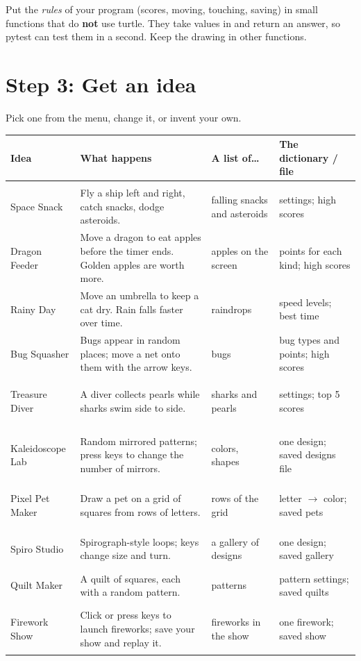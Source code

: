 \documentclass[level=2]{kidscode}
\begin{document}
\begin{tip}
Put the \emph{rules} of your program (scores, moving, touching, saving) in small functions that do
\textbf{not} use turtle. They take values in and return an answer, so pytest can test them in a second.
Keep the drawing in other functions.
\end{tip}

\section{Step 3: Get an idea}
Pick one from the menu, change it, or invent your own.

{\small
\renewcommand{\arraystretch}{1.3}
\begin{longtable}{@{}>{\bfseries\raggedright\arraybackslash}p{2.8cm}>{\raggedright\arraybackslash}p{4.4cm}>{\raggedright\arraybackslash}p{3.6cm}>{\raggedright\arraybackslash}p{3.6cm}@{}}
\toprule
Idea & What happens & A list of\ldots & The dictionary / file \\ \midrule\endhead
\multicolumn{4}{@{}l}{\textbf{Arcade games}} \\ \midrule
Space Snack & Fly a ship left and right, catch snacks, dodge asteroids. & falling snacks and asteroids & settings; high scores \\
Dragon Feeder & Move a dragon to eat apples before the timer ends. Golden apples are worth more. & apples on the screen & points for each kind; high scores \\
Rainy Day & Move an umbrella to keep a cat dry. Rain falls faster over time. & raindrops & speed levels; best time \\
Bug Squasher & Bugs appear in random places; move a net onto them with the arrow keys. & bugs & bug types and points; high scores \\
Treasure Diver & A diver collects pearls while sharks swim side to side. & sharks and pearls & settings; top 5 scores \\ \midrule
\multicolumn{4}{@{}l}{\textbf{Art studios}} \\ \midrule
Kaleidoscope Lab & Random mirrored patterns; press keys to change the number of mirrors. & colors, shapes & one design; saved designs file \\
Pixel Pet Maker & Draw a pet on a grid of squares from rows of letters. & rows of the grid & letter $\to$ color; saved pets \\
Spiro Studio & Spirograph-style loops; keys change size and turn. & a gallery of designs & one design; saved gallery \\
Quilt Maker & A quilt of squares, each with a random pattern. & patterns & pattern settings; saved quilts \\
Firework Show & Click or press keys to launch fireworks; save your show and replay it. & fireworks in the show & one firework; saved show \\
\bottomrule
\end{longtable}}
\end{document}
